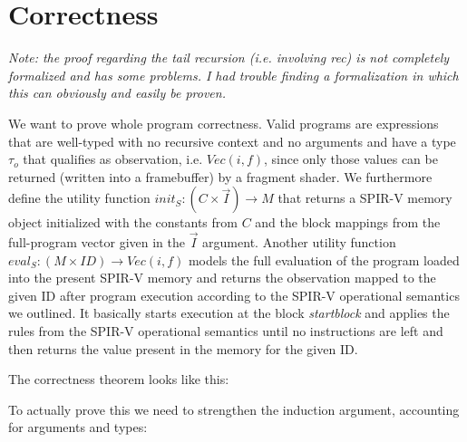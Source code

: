 \documentclass[letterpaper,12pt]{article}
\newcommand{\vi}{\vec{I}}
\begin{document}
\section{Correctness}

\textit{Note: the proof regarding the tail recursion (i.e. involving \textit{rec})
is not completely formalized and has some problems. I had trouble finding a formalization
in which this can obviously and easily be proven.}
\medskip

We want to prove whole program correctness. Valid programs are expressions
that are well-typed with no recursive context and no arguments and
have a type $\tau_o$ that qualifies as observation, i.e. $Vec(i, f)$, since only
those values can be returned (written into a framebuffer) by a fragment shader.
We furthermore define the utility function
$init_S: (C \times \vi) \rightarrow M $ that returns
a SPIR-V memory object initialized with the constants from $C$ and the 
block mappings from the full-program vector given in the $\vi$ argument.
Another utility function $eval_S: (M \times ID) \rightarrow Vec(i, f)$
models the full evaluation of the program loaded into the present SPIR-V
memory and returns the observation mapped to the given ID after
program execution according to the SPIR-V operational semantics we
outlined. It basically starts execution at the block \textit{startblock}
and applies the rules from the SPIR-V operational semantics until
no instructions are left and then returns the value present in the
memory for the given ID.


The correctness theorem looks like this:

\begin{center}
\end{center}
\medskip
To actually prove this we need to strengthen the induction argument,
accounting for arguments and types:
\end{document}
